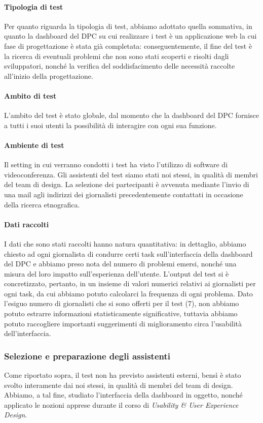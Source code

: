 \paragraph{Tipologia di test}
Per quanto riguarda la tipologia di test, abbiamo adottato quella sommativa, in quanto la dashboard del DPC su cui realizzare i test è un applicazione web la cui fase di progettazione è stata già completata: conseguentemente, il fine del test è la ricerca di eventuali problemi che non sono stati scoperti e risolti dagli sviluppatori, nonché la verifica del soddisfacimento delle necessità raccolte all'inizio della progettazione.

\paragraph{Ambito di test}
L'ambito del test è stato globale, dal momento che la dashboard del DPC fornisce a tutti i suoi utenti la possibilità di interagire con ogni sua funzione.

\paragraph{Ambiente di test}
Il setting in cui verranno condotti i test ha visto l'utilizzo di software di videoconferenza. Gli assistenti del test siamo stati noi stessi, in qualità di membri del team di design. La selezione dei partecipanti è avvenuta mediante l'invio di una mail agli indirizzi dei giornalisti precedentemente contattati in occasione della ricerca etnografica.

\paragraph{Dati raccolti}
I dati che sono stati raccolti hanno natura quantitativa: in dettaglio, abbiamo chiesto ad ogni giornalista di condurre certi task sull'interfaccia della dashboard del DPC e abbiamo preso nota del numero di problemi emersi, nonché una misura del loro impatto sull'esperienza dell'utente. L'output del test si è concretizzato, pertanto, in un insieme di valori numerici relativi ai giornalisti per ogni task, da cui abbiamo potuto calcolarci la frequenza di ogni problema.
Dato l'esiguo numero di giornalisti che si sono offerti per il test (7), non abbiamo potuto estrarre informazioni statisticamente significative, tuttavia abbiamo potuto raccogliere importanti suggerimenti di miglioramento circa l'usabilità dell'interfaccia.

\subsubsection{Selezione e preparazione degli assistenti}
Come riportato sopra, il test non ha previsto assistenti esterni, bensì è stato svolto interamente dai noi stessi, in qualità di membri del team di design. Abbiamo, a tal fine, studiato l'interfaccia della dashboard in oggetto, nonché applicato le nozioni apprese durante il corso di \textit{Usability \& User Experience Design}.

